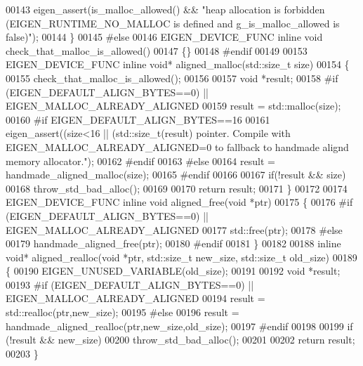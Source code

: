 \begin{DoxyCode}
{00143   eigen\_assert(is\_malloc\_allowed() && \textcolor{stringliteral}{"heap allocation is forbidden (EIGEN\_RUNTIME\_NO\_MALLOC is defined and
       g\_is\_malloc\_allowed is false)"});
00144 \}
00145 \textcolor{preprocessor}{#else }
00146 EIGEN\_DEVICE\_FUNC \textcolor{keyword}{inline} \textcolor{keywordtype}{void} check\_that\_malloc\_is\_allowed()
00147 \{\}
00148 \textcolor{preprocessor}{#endif}
00149 
00153 EIGEN\_DEVICE\_FUNC \textcolor{keyword}{inline} \textcolor{keywordtype}{void}* aligned\_malloc(std::size\_t size)
00154 \{
00155   check\_that\_malloc\_is\_allowed();
00156 
00157   \textcolor{keywordtype}{void} *result;
00158 \textcolor{preprocessor}{  #if (EIGEN\_DEFAULT\_ALIGN\_BYTES==0) || EIGEN\_MALLOC\_ALREADY\_ALIGNED}
00159     result = std::malloc(size);
00160 \textcolor{preprocessor}{    #if EIGEN\_DEFAULT\_ALIGN\_BYTES==16}
00161     eigen\_assert((size<16 || (std::size\_t(result)%
       pointer. Compile with EIGEN\_MALLOC\_ALREADY\_ALIGNED=0 to fallback to handmade alignd memory allocator."});
00162 \textcolor{preprocessor}{    #endif}
00163 \textcolor{preprocessor}{  #else}
00164     result = handmade\_aligned\_malloc(size);
00165 \textcolor{preprocessor}{  #endif}
00166 
00167   \textcolor{keywordflow}{if}(!result && size)
00168     throw\_std\_bad\_alloc();
00169 
00170   \textcolor{keywordflow}{return} result;
00171 \}
00172 
00174 EIGEN\_DEVICE\_FUNC \textcolor{keyword}{inline} \textcolor{keywordtype}{void} aligned\_free(\textcolor{keywordtype}{void} *ptr)
00175 \{
00176 \textcolor{preprocessor}{  #if (EIGEN\_DEFAULT\_ALIGN\_BYTES==0) || EIGEN\_MALLOC\_ALREADY\_ALIGNED}
00177     std::free(ptr);
00178 \textcolor{preprocessor}{  #else}
00179     handmade\_aligned\_free(ptr);
00180 \textcolor{preprocessor}{  #endif}
00181 \}
00182 
00188 \textcolor{keyword}{inline} \textcolor{keywordtype}{void}* aligned\_realloc(\textcolor{keywordtype}{void} *ptr, std::size\_t new\_size, std::size\_t old\_size)
00189 \{
00190   EIGEN\_UNUSED\_VARIABLE(old\_size);
00191 
00192   \textcolor{keywordtype}{void} *result;
00193 \textcolor{preprocessor}{#if (EIGEN\_DEFAULT\_ALIGN\_BYTES==0) || EIGEN\_MALLOC\_ALREADY\_ALIGNED}
00194   result = std::realloc(ptr,new\_size);
00195 \textcolor{preprocessor}{#else}
00196   result = handmade\_aligned\_realloc(ptr,new\_size,old\_size);
00197 \textcolor{preprocessor}{#endif}
00198 
00199   \textcolor{keywordflow}{if} (!result && new\_size)
00200     throw\_std\_bad\_alloc();
00201 
00202   \textcolor{keywordflow}{return} result;
00203 \}

\end{DoxyCode}
